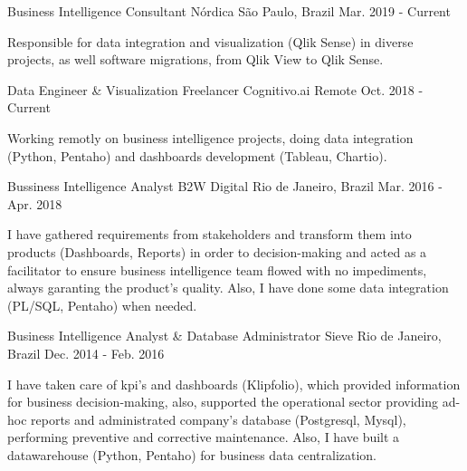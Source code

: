 

\begin{cventries}

  \cventry
    {Business Intelligence Consultant} %
    {Nórdica} %
    {São Paulo, Brazil} %
    {Mar. 2019 - Current} %
    {
      \begin{cvitems} %
        Responsible for data integration and visualization (Qlik Sense) in diverse projects, as well software migrations, from Qlik View to Qlik Sense.
      \end{cvitems}
    }

  \cventry
    {Data Engineer \& Visualization Freelancer} %
    {Cognitivo.ai} %
    {Remote} %
    {Oct. 2018 - Current} %
    {
      \begin{cvitems} %
        Working remotly on business intelligence projects, doing data integration (Python, Pentaho) and dashboards development (Tableau, Chartio).
      \end{cvitems}
    }

  \cventry
    {Bussiness Intelligence Analyst} %
    {B2W Digital} %
    {Rio de Janeiro, Brazil} %
    {Mar. 2016 - Apr. 2018} %
    {
      \begin{cvitems} %
        I have gathered requirements from stakeholders and transform them into products (Dashboards, Reports) in order to decision-making and acted as a facilitator to ensure business intelligence team flowed with no impediments, always garanting the product's quality. Also, I have done some data integration (PL/SQL, Pentaho) when needed.
      \end{cvitems}
    }

  \cventry
    {Business Intelligence Analyst \& Database Administrator} %
    {Sieve} %
    {Rio de Janeiro, Brazil} %
    {Dec. 2014 - Feb. 2016} %
    {
      \begin{cvitems} %
       I have taken care of kpi's and dashboards (Klipfolio), which provided information for business decision-making, also, supported the operational sector providing ad-hoc reports and administrated company's database (Postgresql, Mysql), performing preventive and corrective maintenance. Also, I have built a datawarehouse (Python, Pentaho) for business data centralization.
      \end{cvitems}
    }


\end{cventries}
